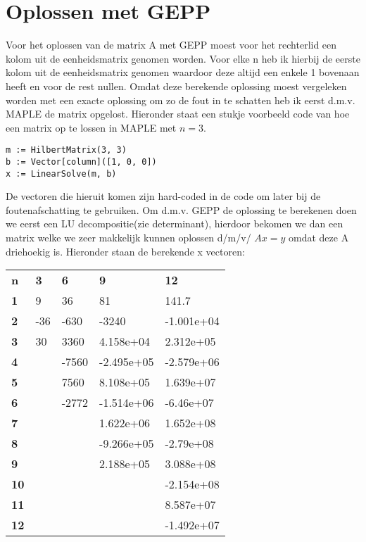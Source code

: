 \documentclass[10pt,a4paper]{article}
\begin{document}
\section{Oplossen met GEPP}
Voor het oplossen van de matrix A met GEPP moest voor het rechterlid een kolom uit de eenheidsmatrix genomen worden. Voor elke n heb ik hierbij de eerste kolom uit de eenheidsmatrix genomen waardoor deze altijd een enkele 1 bovenaan heeft en voor de rest nullen. Omdat deze berekende oplossing moest vergeleken worden met een exacte oplossing om zo de fout in te schatten heb ik eerst d.m.v. MAPLE de matrix opgelost. Hieronder staat een stukje voorbeeld code van hoe een matrix op te lossen in MAPLE met $
n = 3$.
\begin{lstlisting}
m := HilbertMatrix(3, 3)
b := Vector[column]([1, 0, 0])
x := LinearSolve(m, b)
\end{lstlisting}
De vectoren die hieruit komen zijn hard-coded in de code om later bij de foutenafschatting te gebruiken.
\newline
\newline
Om d.m.v. GEPP de oplossing te berekenen doen we eerst een LU decompositie(zie determinant), hierdoor bekomen we dan een matrix welke we zeer makkelijk kunnen oplossen d/m/v/ $Ax = y$ omdat deze A driehoekig is. Hieronder staan de berekende x vectoren:
\newline
\begin{center}
\begin{tabular}{lllll}
\textbf{n}  & \textbf{3} & \textbf{6} & \textbf{9} & \textbf{12} \\
\textbf{1}  & 9          & 36         & 81         & 141.7       \\
\textbf{2}  & -36        & -630       & -3240      & -1.001e+04  \\
\textbf{3}  & 30         & 3360       & 4.158e+04  & 2.312e+05   \\
\textbf{4}  &            & -7560      & -2.495e+05 & -2.579e+06  \\
\textbf{5}  &            & 7560       & 8.108e+05  & 1.639e+07   \\
\textbf{6}  &            & -2772      & -1.514e+06 & -6.46e+07   \\
\textbf{7}  &            &            & 1.622e+06  & 1.652e+08   \\
\textbf{8}  &            &            & -9.266e+05 & -2.79e+08   \\
\textbf{9}  &            &            & 2.188e+05  & 3.088e+08   \\
\textbf{10} &            &            &            & -2.154e+08  \\
\textbf{11} &            &            &            & 8.587e+07   \\
\textbf{12} &            &            &            & -1.492e+07 
\end{tabular}
\end{center}
\end{document}
